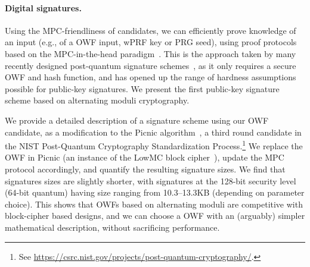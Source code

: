 \paragraph{Digital signatures.} Using the MPC-friendliness of candidates, we can efficiently prove knowledge of
an input (e.g., of a OWF input, wPRF key or PRG seed), using proof protocols
based on the MPC-in-the-head paradigm~\cite{ishai2007-zkmpc}.  This is the approach
taken by many recently designed post-quantum signature
schemes~\cite{chase2017-picnic,katz2018-pqsigs,beullens2020-sigma-mq,beullens2020-legroast,guilhem2019-bbq,banquet},
as it only requires a secure OWF and hash function, and has opened up the range
of hardness assumptions possible for public-key signatures.  We present the
first public-key signature scheme based on alternating moduli cryptography. 

We provide a detailed description of a signature scheme using our OWF candidate,
as a modification to the Picnic
algorithm~\cite{chase2017-picnic,katz2018-pqsigs,kales2020-picnic,picnic-spec}, a
third round candidate in the NIST Post-Quantum Cryptography Standardization
Process.\footnote{See
\url{https://csrc.nist.gov/projects/post-quantum-cryptography/}.} We replace
the OWF in Picnic (an instance of the LowMC block cipher~\cite{albrecht2015-lowmc}),
update the MPC protocol accordingly, and quantify the resulting signature
sizes.  We find that signatures sizes are slightly shorter, with signatures at
the 128-bit security level (64-bit quantum) having size ranging from 10.3--13.3KB (depending
on parameter choice).  This
shows that OWFs based on alternating moduli are competitive with block-cipher
based designs, and we can choose a OWF with an (arguably) simpler mathematical
description, without sacrificing performance. 

